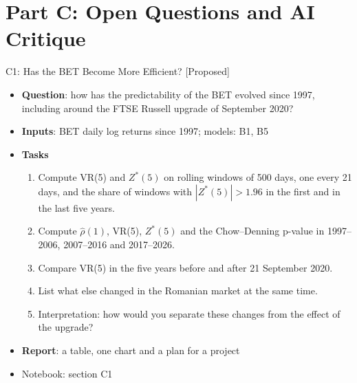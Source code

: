 \section{Part C: Open Questions and AI Critique}

\begin{frame}{C1: Has the BET Become More Efficient? [Proposed]}
\itemsize{\footnotesize}
\begin{itemize}
\item \textbf{Question}: how has the predictability of the BET evolved since 1997, including around the FTSE Russell upgrade of September 2020?
\item \textbf{Inputs}: BET daily log returns since 1997; models: B1, B5
\item \textbf{Tasks}
\begin{enumerate}
    \item Compute VR(5) and $Z^*(5)$ on rolling windows of 500 days, one every 21 days, and the share of windows with $|Z^*(5)| > 1.96$ in the first and in the last five years.
    \item Compute $\hat\rho(1)$, VR(5), $Z^*(5)$ and the Chow--Denning p-value in 1997--2006, 2007--2016 and 2017--2026.
    \item Compare VR(5) in the five years before and after 21 September 2020.
    \item List what else changed in the Romanian market at the same time.
    \item Interpretation: how would you separate these changes from the effect of the upgrade?
\end{enumerate}
\item \textbf{Report}: a table, one chart and a plan for a project
\item Notebook: section C1
\end{itemize}
\end{frame}

